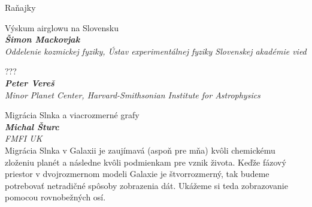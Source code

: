 \documentclass[a4paper]{report}
\begin{document}
                    \begin{tcolorbox}[
                                    colback=red!10,
                    colframe=red!50!black,
                                fonttitle=\Large\bfseries,
                title=09:00
            ]
                {\Large Raňajky}
                                            \end{tcolorbox}
                    \begin{tcolorbox}[
                                    colback=white,
                    colframe=black!70!white,
                                fonttitle=\Large\bfseries,
                title=10:00
            ]
                {\Large Výskum airglowu na Slovensku}
                                                            \\ \textbf{\textit{Šimon Mackovjak}}
                                        \\ \textit{Oddelenie kozmickej fyziky, Ústav experimentálnej fyziky Slovenskej akadémie vied}                                            \end{tcolorbox}
                    \begin{tcolorbox}[
                                    colback=white,
                    colframe=black!70!white,
                                fonttitle=\Large\bfseries,
                title=10:30
            ]
                {\Large ???}
                                                            \\ \textbf{\textit{Peter Vereš}}
                                        \\ \textit{Minor Planet Center, Harvard-Smithsonian Institute for Astrophysics}                                            \end{tcolorbox}
                    \begin{tcolorbox}[
                                    colback=white,
                    colframe=black!70!white,
                                fonttitle=\Large\bfseries,
                title=11:00
            ]
                {\Large Migrácia Slnka a viacrozmerné grafy}
                                                            \\ \textbf{\textit{Michal Šturc}}
                                        \\ \textit{FMFI UK}                                \\[2ex]Migrácia Slnka v Galaxii je zaujímavá (aspoň pre mňa) kvôli chemickému zloženiu planét a následne kvôli podmienkam pre vznik života. Keďže fázový priestor v dvojrozmernom modeli Galaxie je štvorrozmerný, tak budeme potrebovať netradičné spôsoby zobrazenia dát. Ukážeme si teda zobrazovanie pomocou rovnobežných osí.
            \end{tcolorbox}
\end{document}
